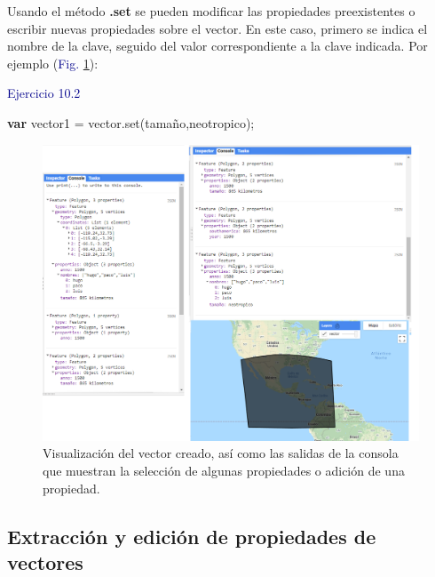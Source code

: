 \documentclass[
  12pt,
  letterpaper,
  twoside]{book}
\newenvironment{Shaded}{\begin{snugshade}}{\end{snugshade}}
\newcommand{\FunctionTok}[1]{\textcolor[rgb]{0.48,0.12,0.64}{#1}}
\newcommand{\KeywordTok}[1]{\textcolor[rgb]{0.00,0.00,0.00}{\textbf{#1}}}
\newcommand{\NormalTok}[1]{#1}
\newcommand{\OperatorTok}[1]{\textcolor[rgb]{0.00,0.00,0.00}{#1}}
\newcommand{\StringTok}[1]{\textcolor[rgb]{0.87,0.29,0.22}{#1}}
\newcommand\boldpurple[1]{\textcolor{darkpurple}{\textbf{#1}}}
\begin{document}
Usando el método \boldpurple{.set} se pueden modificar las propiedades preexistentes o escribir nuevas propiedades sobre el vector. En este caso, primero se indica el nombre de la clave, seguido del valor correspondiente a la clave indicada. Por ejemplo (\textcolor{darkblue}{Fig.} \ref{fig:f71}):

\textcolor{darkblue}{Ejercicio 10.2}

\begin{Shaded}
\begin{Highlighting}[]
\KeywordTok{var}\NormalTok{ vector1 }\OperatorTok{=}\NormalTok{ vector}\OperatorTok{.}\FunctionTok{set}\NormalTok{(}\StringTok{\textquotesingle{}tamaño\textquotesingle{}}\OperatorTok{,}\StringTok{\textquotesingle{}neotropico\textquotesingle{}}\NormalTok{)}\OperatorTok{;}
\end{Highlighting}
\end{Shaded}

\begin{figure}[H]

{\centering \includegraphics[width=0.95\linewidth]{Img/ej10} 

}

\caption{Visualización del vector creado, así como las salidas de la consola que muestran la selección de algunas propiedades o adición de una propiedad.}\label{fig:f71}
\end{figure}

\hypertarget{extracciuxf3n-y-ediciuxf3n-de-propiedades-de-vectores}{%
\subsection*{Extracción y edición de propiedades de vectores}\label{extracciuxf3n-y-ediciuxf3n-de-propiedades-de-vectores}}
\end{document}
